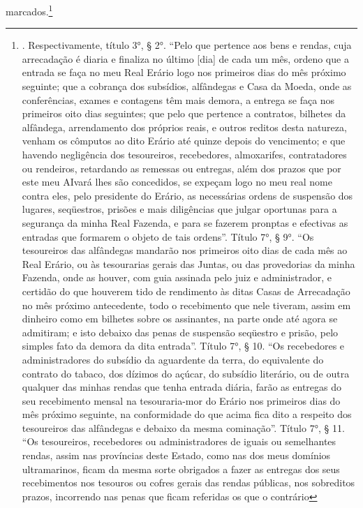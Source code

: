 marcados.\footnote{. Respectivamente, título 3°, § 2°. ``Pelo que
  pertence aos bens e rendas, cuja arrecadação é diaria e finaliza no
  último {[}dia{]} de cada um mês, ordeno que a entrada se faça no meu
  Real Erário logo nos primeiros dias do mês próximo seguinte; que a
  cobrança dos subsídios, alfândegas e Casa da Moeda, onde as
  conferências, exames e contagens têm mais demora, a entrega se faça
  nos primeiros oito dias seguintes; que pelo que pertence a contratos,
  bilhetes da alfândega, arrendamento dos próprios reais, e outros
  reditos desta natureza, venham os cômputos ao dito Erário até quinze
  depois do vencimento; e que havendo negligência dos tesoureiros,
  recebedores, almoxarifes, contratadores ou rendeiros, retardando as
  remessas ou entregas, além dos prazos que por este meu AIvará lhes são
  concedidos, se expeçam logo no meu real nome contra eles, pelo
  presidente do Erário, as necessárias ordens de suspensão dos lugares,
  seqüestros, prisões e mais diligências que julgar oportunas para a
  segurança da minha Real Fazenda, e para se fazerem pronptas e
  efectivas as entradas que formarem o objeto de tais ordens''. Título
  7°, § 9°. ``Os tesoureiros das alfândegas mandarão nos primeiros oito
  dias de cada mês ao Real Erário, ou às tesourarias gerais das Juntas,
  ou das provedorias da minha Fazenda, onde as houver, com guia assinada
  pelo juiz e administrador, e certidão do que houverem tido de
  rendimento às ditas Casas de Arrecadação no mês próximo antecedente,
  todo o recebimento que nele tiveram, assim em dinheiro como em
  bilhetes sobre os assinantes, na parte onde até agora se admitiram; e
  isto debaixo das penas de suspensão seqüestro e prisão, pelo simples
  fato da demora da dita entrada''. Título 7°, § 10. ``Os recebedores e
  administradores do subsídio da aguardente da terra, do equivalente do
  contrato do tabaco, dos dízimos do açúcar, do subsídio literário, ou
  de outra qualquer das minhas rendas que tenha entrada diária, farão as
  entregas do seu recebimento mensal na tesouraria-mor do Erário nos
  primeiros dias do mês próximo seguinte, na conformidade do que acima
  fica dito a respeito dos tesoureiros das alfândegas e debaixo da mesma
  cominação''. Título 7°, § 11. ``Os tesoureiros, recebedores ou
  administradores de iguais ou semelhantes rendas, assim nas províncias
  deste Estado, como nas dos meus domínios ultramarinos, ficam da mesma
  sorte obrigados a fazer as entregas dos seus recebimentos nos tesouros
  ou cofres gerais das rendas públicas, nos sobreditos prazos,
  incorrendo nas penas que ficam referidas os que o contrário
}
